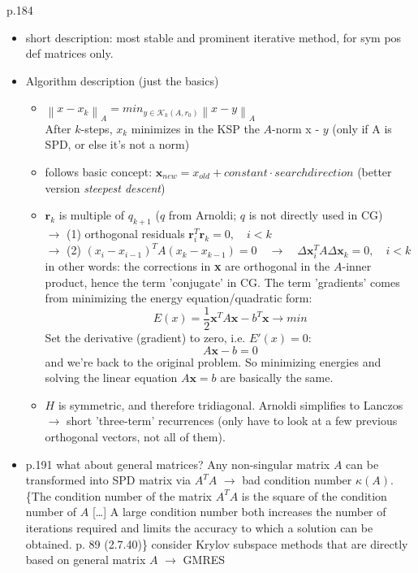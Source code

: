 \documentclass{scrartcl}
\newcommand{\norm}[1]{\left\lVert#1\right\rVert}
\begin{document}
\cite{Ascher:2011:FCN:2031413} p.184\\
\begin{itemize}
\item short description: most stable and prominent iterative method, for sym pos def matrices only.
\item Algorithm description (just the basics)
	\begin{itemize}
	\item $\norm{x - x_k}_A = min_{y \in \mathcal{K}_k(A, r_0)}\norm{x - y}_A$\\
	 After $k$-steps, $x_k$ minimizes in the KSP the $A$-norm x - $y$ (only if A is SPD, or else it's not a norm)
	\item follows basic concept: $\textbf{x}_{new} = x_{old} + constant \cdot search direction$ (better version \textit{steepest descent})
	\item $\textbf{r}_k$ is multiple of $q_{k+1}$ ($q$ from Arnoldi; $q$ is not directly used in CG)\\
	$\to$ (1) orthogonal residuals $\textbf{r}_i^T\textbf{r}_k = 0, \quad i < k$\\
	$\to$ (2) $(x_i - x_{i-1})^T A (x_k - x_{k-1}) = 0 \quad \to \quad\Delta \textbf{x}_i^T A \Delta \textbf{x}_k = 0, \quad  i < k$\\
	in other words: the corrections in \textbf{x} are orthogonal in the $A$-inner product, hence the term 'conjugate' in CG. The term 'gradients' comes from minimizing the energy equation/quadratic form:
	\begin{equation*}
	E(x) = \frac{1}{2} \textbf{x}^TA\textbf{x} - b^T\textbf{x} \to min
	\end{equation*}	 
	Set the derivative (gradient) to zero, i.e. $E'(x) = 0$:
	\begin{equation*}
	A\textbf{x} - b = 0
	\end{equation*}
	and we're back to the original problem. So minimizing energies and solving the linear equation $A\textbf{x} = b$ are basically the same.
	\item $H$ is symmetric, and therefore tridiagonal. Arnoldi simplifies to Lanczos $\to$ short 'three-term' recurrences (only have to look at a few previous orthogonal vectors, not all of them).
	\end{itemize}
\item p.191 what about general matrices? Any non-singular matrix $A$ can be transformed into SPD matrix via $A^TA$ $\to$ bad condition number $\kappa (A)$.\\

\{The condition number of the matrix $A^TA$ is the square of the condition number of $A$ [\ldots] A large condition number both increases the number of iterations required and limits the accuracy to which a solution can be obtained. \cite{press92a} p. 89 (2.7.40)\}
consider Krylov subspace methods that are directly based on general matrix $A$ $\to$ GMRES
\end{itemize}
\end{document}
